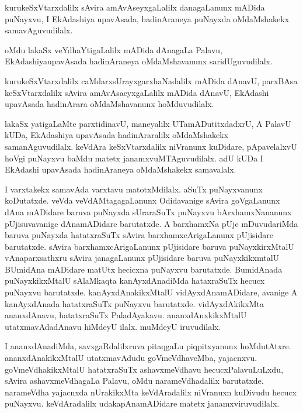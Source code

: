 \documentclass{article}
\begin{document}
\begin{mn}%
kurukeSxVtarxdalilx sAvira amAvAseyxgaLalilx danagaLanunx mADida puNayxvu, I EkAdashiya upavAsada, 
hadinAraneya puNayxda oMdaMshakekx samavAguvudilalx.
\end{mn}

\begin{mn}%
oMdu lakaSx veYdhaYtigaLalilx mADida dAnagaLa Palavu, EkAdashiyaupavAsada hadinAraneya 
oMdaMshavanunx saridUguvudilalx.
\end{mn}

\begin{mn}%
kurukeSxVtarxdalilx caMdarxsUrayxgarxhaNadalilx mADida dAnavU, parxBAsa keSxVtarxdalilx sAvira 
amAvAsaeyxgaLalilx mADida dAnavU, EkAdashi upavAsada hadinArara oMdaMshavanunx hoMduvudilalx.
\end{mn}

\begin{mn}%
lakaSx yatigaLaMte parxtidinavU, maneyalilx UTamADutitxdadxrU, A PalavU kUDa, EkAdashiya upavAsada 
hadinAraralilx oMdaMshakekx samanAguvudilalx. keVdAra keSxVtarxdalilx niVranunx kuDidare, 
pApavelalxvU hoVgi puNayxvu baMdu matetx janamxvuMTAguvudilalx. adU kUDa I EkAdashi upavAsada 
hadinAraneya oMdaMshakekx samavalalx.
\end{mn}

\begin{mn}%
I varxtakekx samavAda varxtavu matotxMdilalx. aSuTx puNayxvanunx koDutatxde. veVda 
veVdAMtagagaLanunx Odidavanige sAvira goVgaLanunx dAna mADidare baruva puNayxda sUraraSuTx puNayxvu 
bArxhamxNananunx pUjisuvavanige dAnamADidare barutatxde. A barxhamxNa pUje mDuvudariMda baruva 
puNayxda hatatxraSuTx sAvira barxhamxcArigaLanunx pUjisidare barutatxde. sAvira 
barxhamxcArigaLanunx pUjisidare baruva puNayxkirxMtalU vAnaparxsathxru sAvira janagaLanunx 
pUjisidare baruva puNayxkikxmtalU BUmidAna mADidare matUtx hecicxna puNayxvu barutatxde. 
BumidAnada puNayxkikxMtalU sAlaMkaqta kanAyxdAnadiMda hataxraSuTx hecucx puNayxvu barutatxde. 
kanAyxdAnakikxMtalU vidAyxdAnamADidare, avanige A kanAyxdAnada hatatxraSuTx puNayxvu barutatxde. 
vidAyxdAkikxMta ananxdAnavu, hatatxraSuTx PaladAyakavu. ananxdAnxkikxMtalU utatxmavAdadAnavu 
hiMdeyU ilalx. muMdeyU iruvudilalx.
\end{mn}

\begin{mn}%
I ananxdAnadiMda, savxgaRdalilxruva pitaqgaLu piqpitxyanunx hoMdutAtxre. ananxdAnakikxMtalU 
utatxmavAdudu goVmeVdhaveMba, yajacnxvu. goVmeVdhakikxMtalU hatatxraSuTx ashavxmeVdhavu 
hecucxPalavuLuLxdu, sAvira ashavxmeVdhagaLa Palavu, oMdu narameVdhadalilx barutatxde. narameVdha 
yajacnxda nUrakikxMta keVdAradalilx niVranuxn kuDivudu hecucx puNayxvu. keVdAradalilx 
udakapAnamADidare matetx janamxviruvudilalx.
\end{mn}
\end{document}
